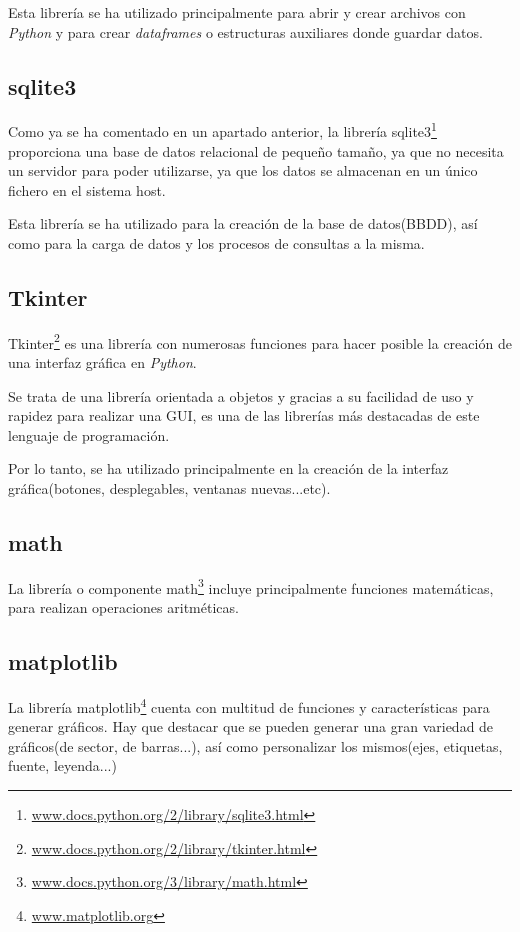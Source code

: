 Esta librería se ha utilizado principalmente para abrir y crear archivos con \emph{Python} y para crear \emph{dataframes} o estructuras auxiliares donde guardar datos.  


\subsection{sqlite3}
Como ya se ha comentado en un apartado anterior, la librería sqlite3\footnote{\href{https://docs.python.org/2/library/sqlite3.html}{www.docs.python.org/2/library/sqlite3.html}} proporciona una base de datos relacional de pequeño tamaño, ya que no necesita un servidor para poder utilizarse, ya que los datos se almacenan en un único fichero en el sistema host.

Esta librería se ha utilizado para la creación de la base de datos(BBDD), así como para la carga de datos y los procesos de consultas a la misma.

\subsection{Tkinter}
Tkinter\footnote{\href{https://docs.python.org/2/library/tkinter.html}{www.docs.python.org/2/library/tkinter.html}} es una librería con numerosas funciones para hacer posible la creación de una interfaz gráfica en \emph{Python}.

Se trata de una librería orientada a objetos y gracias a su facilidad de uso y rapidez para realizar una GUI, es una de las librerías más destacadas de este lenguaje de programación.

Por lo tanto, se ha utilizado principalmente en la creación de la interfaz gráfica(botones, desplegables, ventanas nuevas...etc).


\subsection{math}
La librería o componente math\footnote{\href{https://docs.python.org/3/library/math.html}{www.docs.python.org/3/library/math.html}} incluye principalmente funciones matemáticas, para realizan operaciones aritméticas. 


\subsection{matplotlib}
La librería matplotlib\footnote{\href{https://matplotlib.org/}{www.matplotlib.org}} cuenta con multitud de funciones y características para generar gráficos. Hay que destacar que se pueden generar una gran variedad de gráficos(de sector, de barras...), así como personalizar los mismos(ejes, etiquetas, fuente, leyenda...)

